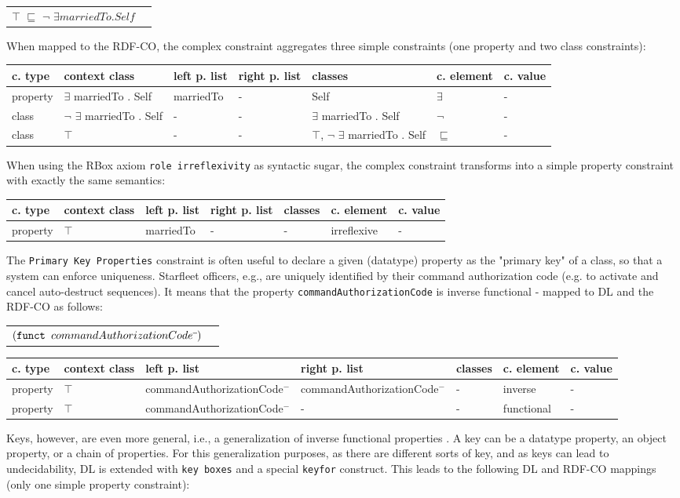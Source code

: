 \documentclass{llncs}
\newcommand{\ms}[1]{\texttt{#1}}
\newenvironment{gcotable}{
  \scriptsize
  \sffamily
  \vspace{0cm}
	\begin{center}
  \begin{tabular}{l|l|l|l|l|l|l}
  \hline
  \textbf{c. type} & \textbf{context class} & \textbf{left p. list} & \textbf{right p. list} & \textbf{classes} & \textbf{c. element} & \textbf{c. value} \\
  \hline

}{
  \hline
  \end{tabular}
	\end{center}
}
\newenvironment{DL}{
  \vspace{0cm}
	\begin{center}
  \begin{tabular}{r l}

}{
  \end{tabular}
	\end{center}
}
\begin{document}
\begin{DL}
$\top$ $\sqsubseteq$ $\neg$ $\exists  marriedTo . Self$
\end{DL}

When mapped to the RDF-CO, the complex constraint aggregates three simple constraints (one property and two class constraints):

\begin{gcotable}
property & $\exists$ marriedTo . Self & marriedTo & - & Self & $\exists$ & - \\
class & $\neg$ $\exists$ marriedTo . Self & - & - & $\exists$ marriedTo . Self & $\neg$ & - \\
class & $\top$ & - & - & $\top$, $\neg$ $\exists$ marriedTo . Self & $\sqsubseteq$ & - \\
\end{gcotable}

When using the RBox axiom \ms{role irreflexivity} as syntactic sugar, 
the complex constraint transforms into a simple property constraint with exactly the same semantics:

\begin{gcotable}
property & $\top$ & marriedTo & - & - & irreflexive & - \\
\end{gcotable}

The \ms{Primary Key Properties} constraint is often useful to declare a given (datatype) property as the "primary key" of a class, so that a system can enforce uniqueness. 
Starfleet officers, e.g., are uniquely identified by their command authorization code (e.g. to activate and cancel auto-destruct sequences).
It means that the property \ms{commandAuthorizationCode} is inverse functional - mapped to DL and the RDF-CO as follows:

\begin{DL}
$(\ms{funct } commandAuthorizationCode\sp{\overline{\ }})$
\end{DL}

\begin{gcotable}
property & $\top$ & commandAuthorizationCode$^{-}$ & commandAuthorizationCode$^{-}$ & - & inverse & - \\
property & $\top$ & commandAuthorizationCode$^{-}$ & - & - & functional & - \\
\end{gcotable}

Keys, however, are even more general, i.e., a generalization of inverse functional properties \cite{Schneider2009}.
A key can be a datatype property, an object property, or a chain of properties.
For this generalization purposes, as there are different sorts of key, and as keys can lead to undecidability, 
DL is extended with \ms{key boxes} and a special \ms{keyfor} construct\cite{Lutz2005}.
This leads to the following DL and RDF-CO mappings (only one simple property constraint):
\end{document}
